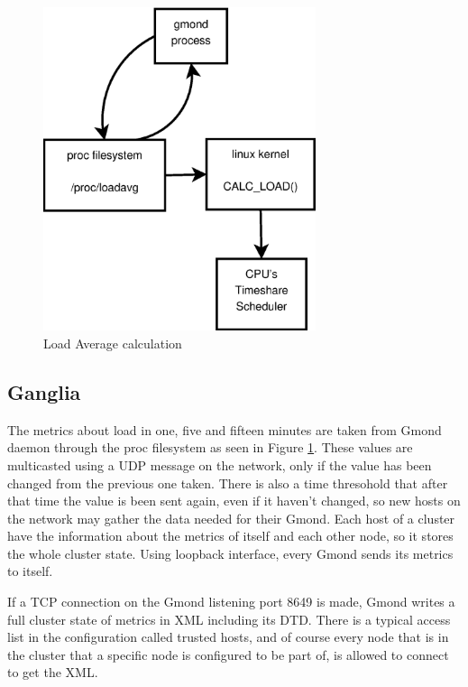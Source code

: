 \begin{figure}[htb]
\centering
 \includegraphics[width=80mm]{images/calc_load.eps}
\caption{Load Average calculation}
\label{figure:calc_load}
\end{figure}


\subsection{Ganglia}\label{subsec:ganglia}

The metrics about load in one, five and fifteen minutes are taken from Gmond daemon through the proc filesystem as seen in Figure \ref{figure:calc_load}. These values are multicasted using a UDP message on the network, only if the value has been changed from the previous one taken. There is also a time thresohold that after that time the value is been sent again, even if it haven't changed, so new hosts on the network may gather the data needed for their Gmond. Each host of a cluster have the information about the metrics of itself and each other node, so it stores the whole cluster state. Using loopback interface, every Gmond sends its metrics to itself.

If a TCP connection on the Gmond listening port 8649 is made, Gmond writes a full cluster state of metrics in XML including its DTD. There is a typical access list in the configuration called trusted hosts, and of course every node that is in the cluster that a specific node is configured to be part of, is allowed to connect to get the XML.

